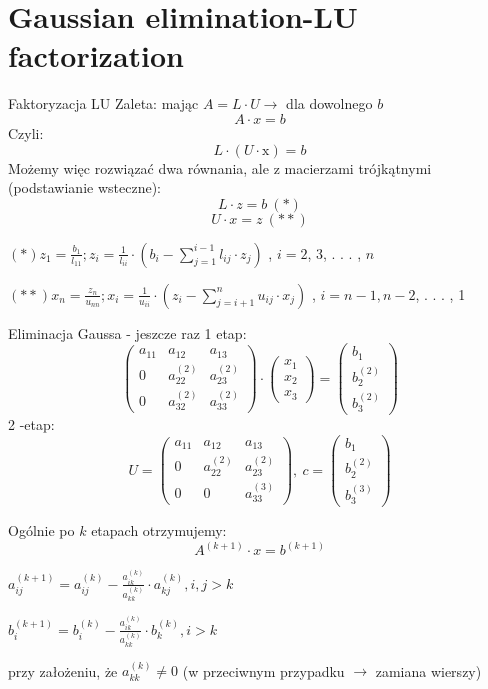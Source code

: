 \section{Gaussian elimination-LU factorization}
\begin{frame}{Faktoryzacja LU }
Zaleta: mając $A=L\cdot U\rightarrow $ dla dowolnego $b$
$$
A\cdot x=b
$$
Czyli:
$$
L\cdot(U\cdot \mathrm{x})=b
$$
Możemy więc rozwiązać dwa równania, ale z macierzami trójkątnymi (podstawianie wsteczne):
$$
L\cdot z=b\ (*)
$$
$$
U\cdot x=z\ (**)
$$
\begin{center}
$(*)z_{1}=\displaystyle \frac{b_{1}}{l_{11}};z_{i}=\frac{1}{l_{ii}}\cdot(b_{i}-\sum_{j=1}^{i-1}l_{ij}\cdot z_{j})$ , $i=2$, 3, . . . , $n$
\end{center}
$(**)x_{n}=\displaystyle \frac{z_{n}}{u_{nn}};x_{i}=\frac{1}{u_{ii}}\cdot(z_{i}-\sum_{j=i+1}^{n}u_{ij}\cdot x_{j})$ , $i=n-1, n-2$, . . . , 1
\end{frame}
\begin{frame}{Eliminacja Gaussa - jeszcze raz}
1 etap:
$$
\left(\begin{array}{lll}
a_{11} & a_{12} & a_{13}\\
0 & a_{22}^{(2)} &a_{23}^{(2)}\\
0 & a_{32}^{(2)} & a_{33}^{(2)}
\end{array}\right) \cdot
 \left(\begin{array}{l}
x_{1}\\
x_{2}\\
x_{3}
\end{array}\right)=
\left(\begin{array}{l}
b_{1} \\
b_{2}^{(2)} \\
b_{3}^{(2)}
\end{array}\right)
$$
2 -etap:
$$
U = \left(\begin{array}{lll}
a_{11} & a_{12} & a_{13}\\
0 & a_{22}^{(2)} &a_{23}^{(2)}\\
0 & 0 & a_{33}^{(3)}
\end{array}\right)
,\ c=\left(\begin{array}{l}
b_{1}\\
b_{2}^{(2)}\\
b_{3}^{(3)}
\end{array}\right)
$$
\end{frame}
\begin{frame}{}

Ogólnie po $k$ etapach otrzymujemy:
$$
A^{(k+1)}\cdot x=b^{(k+1)}
$$

$a_{ij}^{(k+1)}=a_{ij}^{(k)}-\displaystyle \frac{a_{ik}^{(k)}}{a_{kk}^{(k)}}\cdot a_{kj}^{(k)}, i, j>k$ 


$b_{i}^{(k+1)}=b_{i}^{(k)}-\displaystyle \frac{a_{ik}^{(k)}}{a_{kk}^{(k)}}\cdot b_{k}^{(k)}, i>k$ 

przy założeniu, że $a_{kk}^{(k)}\neq 0$ (w przeciwnym przypadku $\rightarrow$ zamiana wierszy)

\end{frame}
